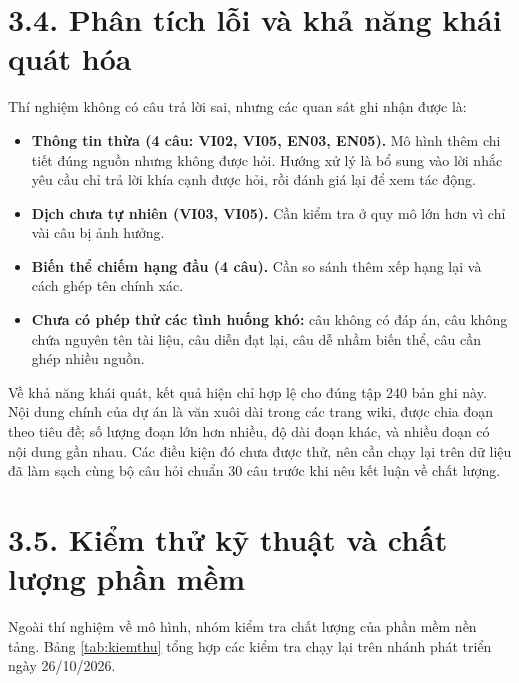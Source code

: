 \section{3.4. Phân tích lỗi và khả năng khái quát hóa}

Thí nghiệm không có câu trả lời sai, nhưng các quan sát ghi nhận được là:


\begin{itemize}
\item \textbf{Thông tin thừa (4 câu: VI02, VI05, EN03, EN05).} Mô hình thêm chi tiết đúng nguồn nhưng không được hỏi. Hướng xử lý là bổ sung vào lời nhắc yêu cầu chỉ trả lời khía cạnh được hỏi, rồi đánh giá lại để xem tác động.
\item \textbf{Dịch chưa tự nhiên (VI03, VI05).} Cần kiểm tra ở quy mô lớn hơn vì chỉ vài câu bị ảnh hưởng.
\item \textbf{Biến thể chiếm hạng đầu (4 câu).} Cần so sánh thêm xếp hạng lại và cách ghép tên chính xác.
\item \textbf{Chưa có phép thử các tình huống khó:} câu không có đáp án, câu không chứa nguyên tên tài liệu, câu diễn đạt lại, câu dễ nhầm biến thể, câu cần ghép nhiều nguồn.
\end{itemize}


Về khả năng khái quát, kết quả hiện chỉ hợp lệ cho đúng tập 240 bản ghi này. Nội dung chính của dự án là văn xuôi dài trong các trang wiki, được chia đoạn theo tiêu đề; số lượng đoạn lớn hơn nhiều, độ dài đoạn khác, và nhiều đoạn có nội dung gần nhau. Các điều kiện đó chưa được thử, nên cần chạy lại trên dữ liệu đã làm sạch cùng bộ câu hỏi chuẩn 30 câu trước khi nêu kết luận về chất lượng.


\section{3.5. Kiểm thử kỹ thuật và chất lượng phần mềm}

Ngoài thí nghiệm về mô hình, nhóm kiểm tra chất lượng của phần mềm nền tảng. Bảng \ref{tab:kiemthu} tổng hợp các kiểm tra chạy lại trên nhánh phát triển ngày 26/10/2026.


